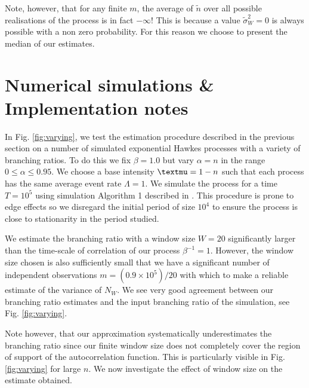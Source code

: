 \documentclass{article}
\begin{document}
Note, however, that for any finite $m$, the average of $\tilde{n}$ over all
possible realisations of the process is in fact $- \infty$! This is because a
value $\tilde{\sigma}^2_W = 0$ is always possible with a non zero probability.
For this reason we choose to present the median of our estimates.

\section{Numerical simulations \& Implementation notes}

In Fig. \ref{fig:varying}, we test the estimation procedure described in the
previous section on a number of simulated exponential Hawkes processes with a
variety of branching ratios. To do this we fix $\beta = 1.0$ but vary $\alpha
= n$ in the range $0 \leq \alpha \leq 0.95$. We choose a base intensity
${\textmu}= 1 - n$ such that each process has the same average event rate
$\Lambda = 1$. We simulate the process for a time $T = 10^5$ using simulation
Algorithm 1 described in {\cite{moller2005perfect}}. This procedure is prone
to edge effects so we disregard the initial period of size $10^4$ to ensure
the process is close to stationarity in the period studied.

We estimate the branching ratio with a window size $W = 20$ significantly
larger than the time-scale of correlation of our process $\beta^{- 1} = 1$.
However, the window size chosen is also sufficiently small that we have a
significant number of independent observations $m = (0.9 \times 10^5) / 20$
with which to make a reliable estimate of the variance of $N_W$. We see very
good agreement between our branching ratio estimates and the input branching
ratio of the simulation, see Fig. \ref{fig:varying}.

Note however, that our approximation systematically underestimates the
branching ratio since our finite window size does not completely cover the
region of support of the autocorrelation function. This is particularly
visible in Fig. \ref{fig:varying} for large $n$. We now investigate the effect
of window size on the estimate obtained.
\end{document}
